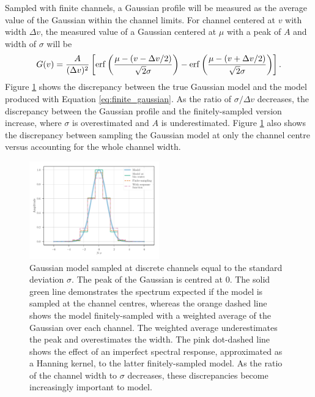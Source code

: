 \documentclass{rnaastex}
\begin{document}
Sampled with finite channels, a Gaussian profile will be measured as the average value of the Gaussian within the channel limits.  For channel centered at $v$ with width $\Delta v$, the measured value of a Gaussian centered at $\mu$ with a peak of $A$ and width of $\sigma$ will be
\begin{equation}
    \label{eq:finite_gaussian}
    G(v) = \frac{A}{(\Delta v)^2} \left[ {\rm erf}\left( \frac{\mu - (v - \Delta v / 2)}{\sqrt{2}\sigma} \right) - {\rm erf}\left( \frac{\mu - (v + \Delta v / 2)}{\sqrt{2}\sigma} \right) \right].
\end{equation}
Figure \ref{fig:gaussian_finite_model} shows the discrepancy between the true Gaussian model and the model produced with Equation \ref{eq:finite_gaussian}. As the ratio of $\sigma / \Delta v$ decreases, the discrepancy between the Gaussian profile and the finitely-sampled version increase, where $\sigma$ is overestimated and $A$ is underestimated. Figure \ref{fig:gaussian_finite_model} also shows the discrepancy between sampling the Gaussian model at only the channel centre versus accounting for the whole channel width.

\begin{figure}
\includegraphics[width=0.5\textwidth]{example_model_chan_1sigma}
\caption{\label{fig:gaussian_finite_model} Gaussian model sampled at discrete channels equal to the standard deviation $\sigma$.  The peak of the Gaussian is centred at $0$. The solid green line demonstrates the spectrum expected if the model is sampled at the channel centres, whereas the orange dashed line shows the model finitely-sampled with a weighted average of the Gaussian over each channel.  The weighted average underestimates the peak and overestimates the width.  The pink dot-dashed line shows the effect of an imperfect spectral response, approximated as a Hanning kernel, to the latter finitely-sampled model.  As the ratio of the channel width to $\sigma$ decreases, these discrepancies become increasingly important to model.}
\end{figure}
\end{document}
